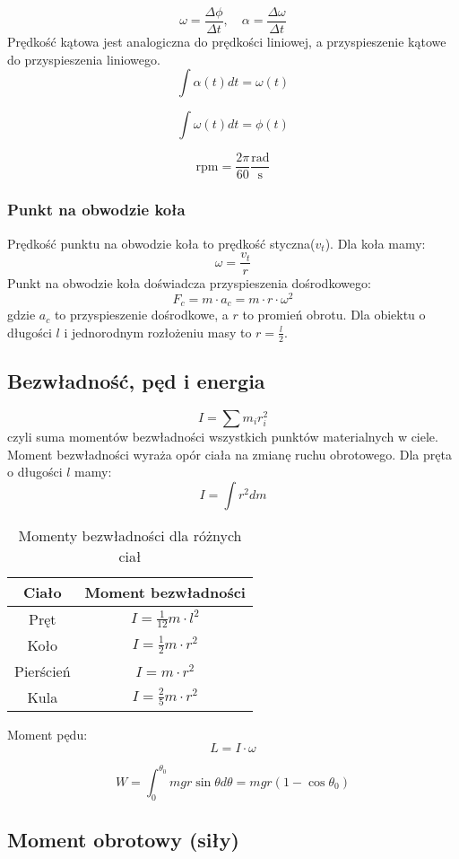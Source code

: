 \documentclass{../notatki}
\begin{document}
$$
\omega = \frac{\Delta \phi}{\Delta t}, \quad \alpha = \frac{\Delta
\omega}{\Delta t}
$$
Prędkość kątowa jest analogiczna do prędkości liniowej, a przyspieszenie
kątowe do przyspieszenia liniowego.
$$
\int \alpha(t) dt = \omega(t)
$$

$$
\int \omega(t) dt = \phi(t)
$$

$$
\text{rpm} = \frac{2\pi}{60} \frac{\text{rad}}{\text{s}}
$$

\subsubsection{Punkt na obwodzie koła}
Prędkość punktu na obwodzie koła to prędkość styczna($v_t$). Dla koła mamy:
$$
\omega = \frac{v_t}{r}
$$
Punkt na obwodzie koła doświadcza przyspieszenia dośrodkowego:
$$
F_c = m \cdot a_c = m \cdot r \cdot \omega^2
$$
gdzie $a_c$ to przyspieszenie dośrodkowe, a $r$ to promień obrotu. Dla obiektu
o długości $l$ i jednorodnym rozłożeniu masy to $r = \frac{l}{2}$.

\subsection{Bezwładność, pęd i energia}

$$
I = \sum m_i r_i^2
$$
czyli suma momentów bezwładności wszystkich punktów materialnych w ciele.
Moment bezwładności wyraża opór ciała na zmianę ruchu obrotowego.
Dla pręta o długości $l$ mamy:
$$
I = \int r^2 dm
$$

\begin{table*}[ht]
  \centering
  \begin{tabular}{c|c}
    Ciało & Moment bezwładności \\ \hline
    Pręt & $I = \frac{1}{12} m \cdot l^2$ \\ \hline
    Koło & $I = \frac{1}{2} m \cdot r^2$ \\ \hline
    Pierścień & $I = m \cdot r^2$ \\ \hline
    Kula & $I = \frac{2}{5} m \cdot r^2$
  \end{tabular}
  \caption{Momenty bezwładności dla różnych ciał}
\end{table*}

Moment pędu:
$$
L = I \cdot \omega
$$

$$
W = \int^{\theta_0}_0 mgr\sin\theta d\theta = mgr(1 - \cos\theta_0)
$$

\subsection{Moment obrotowy (siły)}
\end{document}
